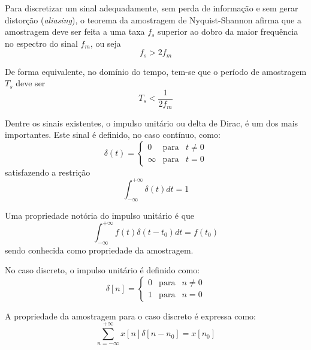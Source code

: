 \documentclass[12pt,a4paper]{report}
\begin{document}
  Para discretizar um sinal adequadamente, sem perda de informação e sem gerar distorção (\textit{aliasing}), o
  teorema da amostragem de Nyquist-Shannon \cite{lathi} afirma que a amostragem deve ser feita a uma taxa $f_s$
  superior ao dobro da maior frequência no espectro do sinal $f_m$, ou seja
  \begin{equation}
    f_s > 2 f_m
  \end{equation}

  De forma equivalente, no domínio do tempo, tem-se que o período de amostragem $T_s$ deve ser
  \begin{equation}
    T_s  < \frac{1}{2 f_m}
  \end{equation}

  Dentre os sinais existentes, o impulso unitário ou delta de Dirac, é um dos mais importantes. Este sinal é
  definido, no caso contínuo, como:
  \begin{equation}
    \delta(t) =
      \left
      \{
      \begin{array}{rcl}
        0 & \mbox{para} & t \neq 0 \\
        \infty & \mbox{para} & t = 0
      \end{array}
      \right.
  \end{equation}
  satisfazendo a restrição
  \begin{equation}
    \int_{-\infty}^{+\infty} \delta(t) dt = 1
  \end{equation}

  Uma propriedade notória do impulso unitário é que
  \begin{equation}
    \int_{-\infty}^{+\infty} f(t) \delta(t-t_0) dt = f(t_0)
  \end{equation}
  sendo conhecida como propriedade da amostragem.

  No caso discreto, o impulso unitário é definido como:
  \begin{equation}
    \delta[n] =
      \left
      \{
      \begin{array}{rcl}
        0 & \mbox{para} & n \neq 0 \\
        1 & \mbox{para} & n = 0
      \end{array}
      \right.
  \end{equation}

  A propriedade da amostragem para o caso discreto é expressa como:
  \begin{equation}
    \sum_{n = -\infty}^{+\infty} x[n] \delta[n-n_0] = x[n_0]
  \end{equation}
\end{document}

